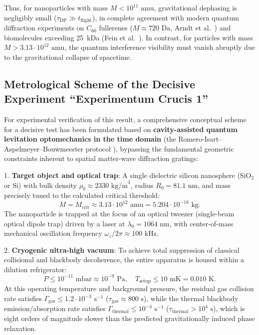\documentclass[11pt,a4paper]{article}
\theoremstyle{definition}
\begin{document}
Thus, for nanoparticles with mass $M < 10^{11}\text{ amu}$, gravitational dephasing is negligibly small ($\tau_{\text{DP}} \gg t_{\text{flight}}$), in complete agreement with modern quantum diffraction experiments on $C_{60}$ fullerenes ($M \approx 720\text{ Da}$, Arndt et al.~\cite{ref42}) and biomolecules exceeding 25~kDa (Fein et al.~\cite{ref43}). In contrast, for particles with mass $M > 3.13 \cdot 10^{12}\text{ amu}$, the quantum interference visibility must vanish abruptly due to the gravitational collapse of spacetime.

\subsection{Metrological Scheme of the Decisive Experiment ``Experimentum Crucis 1''}\label{sec:5.3}

For experimental verification of this result, a comprehensive conceptual scheme for a decisive test has been formulated based on \textbf{cavity-assisted quantum levitation optomechanics in the time domain} (the Romero-Isart--Aspelmeyer--Bouwmeester protocol \cite{ref40,ref41,ref42}), bypassing the fundamental geometric constraints inherent to spatial matter-wave diffraction gratings:

1. \textbf{Target object and optical trap}: A single dielectric silicon nanosphere ($\text{SiO}_2$ or $\text{Si}$) with bulk density $\rho_0 \approx 2330\text{ kg/m}^3$, radius $R_0 = 81.1\text{ nm}$, and mass precisely tuned to the calculated critical threshold:
\begin{equation}\label{eq:5.46a}\tag{5.46a}
M = M_{\text{crit}} \approx 3.13 \cdot 10^{12}\text{ amu} = 5.204 \cdot 10^{-18}\text{ kg}.
\end{equation}
The nanoparticle is trapped at the focus of an optical tweezer (single-beam optical dipole trap) driven by a laser at $\lambda_0 = 1064\text{ nm}$, with center-of-mass mechanical oscillation frequency $\omega_z / 2\pi \approx 100\text{ kHz}$.

2. \textbf{Cryogenic ultra-high vacuum}: To achieve total suppression of classical collisional and blackbody decoherence, the entire apparatus is housed within a dilution refrigerator:
\begin{equation}\label{eq:5.46}\tag{5.46}
P \le 10^{-11}\text{ mbar} \approx 10^{-9}\text{ Pa}, \quad T_{\text{setup}} \le 10\text{ mK} = 0.010\text{ K}.
\end{equation}
At this operating temperature and background pressure, the residual gas collision rate satisfies $\Gamma_{\text{gas}} \le 1.2 \cdot 10^{-3}\text{ s}^{-1}$ ($\tau_{\text{gas}} \approx 800\text{ s}$), while the thermal blackbody emission/absorption rate satisfies $\Gamma_{\text{thermal}} \le 10^{-4}\text{ s}^{-1}$ ($\tau_{\text{thermal}} > 10^4\text{ s}$), which is eight orders of magnitude slower than the predicted gravitationally induced phase relaxation.
\end{document}
